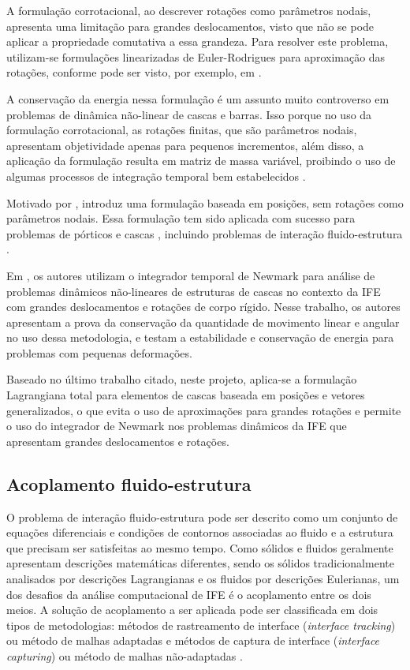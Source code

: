 \documentclass[tese_patricia.tex]{subfiles}
\begin{document}
A formulação corrotacional, ao descrever rotações como parâmetros nodais, apresenta uma limitação para grandes deslocamentos, visto que não se pode aplicar a propriedade comutativa a essa grandeza. Para resolver este problema, utilizam-se formulações linearizadas de Euler-Rodrigues para aproximação das rotações, conforme pode ser visto, por exemplo, em .

A conservação da energia nessa formulação é um assunto muito controverso em problemas de dinâmica não-linear de cascas e barras. Isso porque no uso da formulação corrotacional, as rotações finitas, que são parâmetros nodais, apresentam objetividade apenas para pequenos incrementos, além disso, a aplicação da formulação resulta em matriz de massa variável, proibindo o uso de algumas processos de integração temporal bem estabelecidos \cite{SanchesC:2013}.

Motivado por ,  introduz uma formulação baseada em posições, sem rotações como parâmetros nodais. Essa formulação tem sido aplicada com sucesso para problemas de pórticos e cascas \cite{CodaG:2004,CodaP:2010,CarrazedoC:2010,CodaP:2011,SanchesC:2016}, incluindo problemas de interação fluido-estrutura \cite{SanchesC:2013,SanchesC:2014,FernandesCS:2019,AvanciniS:2020}.

Em , os autores utilizam o integrador temporal de Newmark para análise de problemas dinâmicos não-lineares de estruturas de cascas no contexto da IFE com grandes deslocamentos e rotações de corpo rígido. Nesse trabalho, os autores apresentam a prova da conservação da quantidade de movimento linear e angular no uso dessa metodologia, e testam a estabilidade e conservação de energia para problemas com pequenas deformações. 

Baseado no último trabalho citado, neste projeto, aplica-se a formulação Lagrangiana total para elementos de cascas baseada em posições e vetores generalizados, o que evita o uso de aproximações para grandes rotações e permite o uso do integrador de Newmark nos problemas dinâmicos da IFE que apresentam grandes deslocamentos e rotações.

\subsection{Acoplamento fluido-estrutura}
\label{couplingsection}


O problema de interação fluido-estrutura pode ser descrito como um conjunto de equações diferenciais e condições de contornos associadas ao fluido e a estrutura que precisam ser satisfeitas ao mesmo tempo. Como sólidos e fluidos geralmente apresentam descrições matemáticas diferentes, sendo os sólidos tradicionalmente analisados por descrições Lagrangianas e os fluidos por descrições Eulerianas, um dos desafios da análise computacional de IFE é o acoplamento entre os dois meios. A solução de acoplamento a ser aplicada pode ser classificada em dois tipos de metodologias: métodos de rastreamento de interface (\textit{interface tracking}) ou método de malhas adaptadas e métodos de captura de interface (\textit{interface capturing}) ou método de malhas não-adaptadas \cite{Houetal:2012,BazilevsTT:2013b}.
\end{document}
